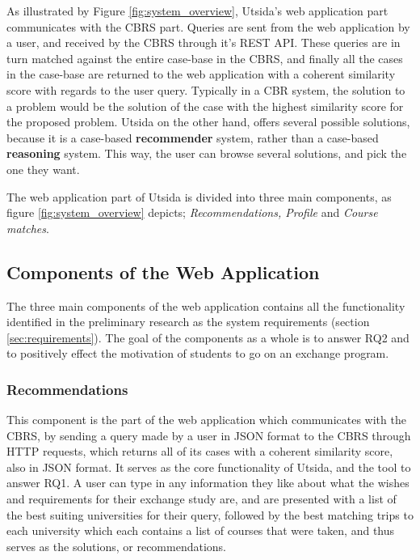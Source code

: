 As illustrated by Figure \ref{fig:system_overview}, Utsida's web application part communicates with the CBRS part. Queries are sent from the web application by a user, and received by the CBRS through it's REST API. These queries are in turn matched against the entire case-base in the CBRS, and finally all the cases in the case-base are returned to the web application with a coherent similarity score with regards to the user query. Typically in a CBR system, the solution to a problem would be the solution of the case with the highest similarity score for the proposed problem. Utsida on the other hand, offers several possible solutions, because it is a case-based \textbf{recommender} system, rather than a case-based \textbf{reasoning} system. This way, the user can browse several solutions, and pick the one they want. 

The web application part of Utsida is divided into three main components, as figure \ref{fig:system_overview} depicts; \emph{Recommendations, Profile} and \emph{Course matches}. 

\subsection{Components of the Web Application}
The three main components of the web application contains all the functionality identified in the preliminary research as the system requirements (section \ref{sec:requirements}). The goal of the components as a whole is to answer RQ2 and to positively effect the motivation of students to go on an exchange program. 

\subsubsection{Recommendations}
This component is the part of the web application which communicates with the CBRS, by sending a query made by a user in JSON format to the CBRS through HTTP requests, which returns all of its cases with a coherent similarity score, also in JSON format. It serves as the core functionality of Utsida, and the tool to answer RQ1. A user can type in any information they like about what the wishes and requirements for their exchange study are, and are presented with a list of the best suiting universities for their query, followed by the best matching trips to each university which each contains a list of courses that were taken, and thus serves as the solutions, or recommendations.


